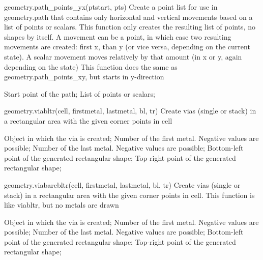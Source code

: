 \begin{APIfunc}{geometry.path\_points\_yx(ptstart, pts)}
    Create a point list for use in geometry.path that contains only horizontal and vertical movements based on a list of points or scalars.
This function only creates the resulting list of points, no shapes by itself.
A movement can be a point, in which case two resulting movements are created: first x, than y (or vice versa, depending on the current state).
A scalar movement moves relatively by that amount (in x or y, again depending on the state)
This function does the same as geometry.path\_points\_xy, but starts in y-direction
    \begin{APIparameters}
            Start point of the path;
            List of points or scalars;
    \end{APIparameters}
\end{APIfunc}
\begin{APIfunc}{geometry.viabltr(cell, firstmetal, lastmetal, bl, tr)}
    Create vias (single or stack) in a rectangular area with the given corner points in cell
    \begin{APIparameters}
            Object in which the via is created;
            Number of the first metal. Negative values are possible;
            Number of the last metal. Negative values are possible;
            Bottom-left point of the generated rectangular shape;
            Top-right point of the generated rectangular shape;
    \end{APIparameters}
\end{APIfunc}
\begin{APIfunc}{geometry.viabarebltr(cell, firstmetal, lastmetal, bl, tr)}
    Create vias (single or stack) in a rectangular area with the given corner points in cell. This function is like viabltr, but no metals are drawn
    \begin{APIparameters}
            Object in which the via is created;
            Number of the first metal. Negative values are possible;
            Number of the last metal. Negative values are possible;
            Bottom-left point of the generated rectangular shape;
            Top-right point of the generated rectangular shape;
    \end{APIparameters}
\end{APIfunc}
